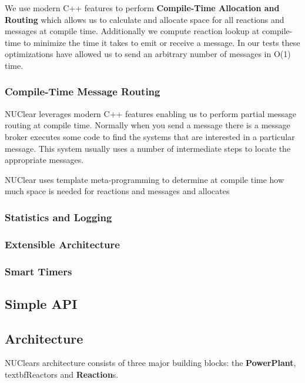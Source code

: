\documentclass[english,12pt]{scrartcl}
\begin{document}
				We use modern C++ features to perform \textbf{Compile-Time Allocation and Routing} which allows us to calculate and allocate space
				for all reactions and messages at compile time.
				Additionally we compute reaction lookup at compile-time to minimize the time it takes to emit or receive a message.
				In our tests these optimizations have allowed us to send an arbitrary number of messages in O(1) time.
				
			\subsubsection{Compile-Time Message Routing}
				NUClear leverages modern C++ features enabling us to perform partial message routing at compile time.
				Normally when you send a message there is a message broker executes some code to find the systems that are interested in a particular message.
				This system usually uses a number of intermediate steps to locate the appropriate messages.
				
				NUClear uses template meta-programming to determine at compile time how much space is needed for reactions and messages and allocates
				
				
			\subsubsection{Statistics and Logging}
				
			\subsubsection{Extensible Architecture}
				
			\subsubsection{Smart Timers}
						\subsection{Simple API}
		
		\subsection{Architecture}
			NUClears architecture consists of three major building blocks: the \textbf{PowerPlant}, textbf{Reactor}s and \textbf{Reaction}s.
		
\end{document}
